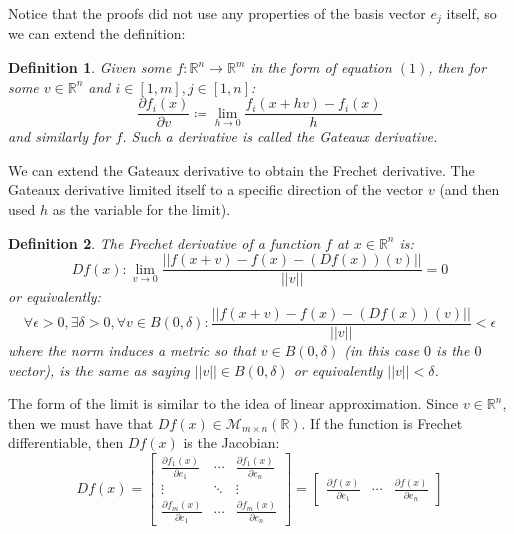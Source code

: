 \documentclass[10pt,letterpaper]{article} %
\newtheorem{defn}{Definition}[section]
\begin{document}
Notice that the proofs did not use any properties of the basis vector $e_j$ itself, so we can extend the definition:
\begin{defn}
Given some $f: \mathbb{R}^n \xrightarrow{} \mathbb{R}^m$ in the form of equation $(1)$, then for some $v \in \mathbb{R}^n$ and $i \in [1, m], j \in [1, n]$:
\begin{equation*}
\frac{\partial f_i(x)}{\partial v} \coloneq \lim_{h \xrightarrow{} 0}\frac{f_i(x+hv) - f_i(x)}{h}
\end{equation*}
and similarly for $f$. Such a derivative is called the Gateaux derivative.
\end{defn}
We can extend the Gateaux derivative to obtain the Frechet derivative. The Gateaux derivative limited itself to a specific direction of the vector $v$ (and then used $h$ as the variable for the limit).
\begin{defn}
The Frechet derivative of a function $f$ at $x \in \mathbb{R}^n$ is:
\begin{equation*}
Df(x): \lim_{v \xrightarrow{} 0} \frac{||f(x + v) - f(x) - (Df(x))(v)||}{||v||} = 0
\end{equation*}
or equivalently:
\begin{equation*}
\forall \epsilon > 0, \exists \delta > 0, \forall v \in B(0, \delta): \frac{||f(x+v) - f(x) - (Df(x))(v)||}{||v||} < \epsilon
\end{equation*}
where the norm induces a metric so that $v \in B(0, \delta)$ (in this case $0$ is the $0$ vector), is the same as saying $||v|| \in B(0, \delta)$ or equivalently $||v|| < \delta$.
\end{defn}
The form of the limit is similar to the idea of linear approximation. Since $v \in \mathbb{R}^n$, then we must have that $Df(x) \in \mathcal{M}_{m \times n}(\mathbb{R})$. If the function is Frechet differentiable, then $Df(x)$ is the Jacobian:
\begin{equation*}
Df(x) = \begin{bmatrix}
\frac{\partial f_1(x)}{\partial e_1} & \cdots &  \frac{\partial f_1(x)}{\partial e_n}\\
\vdots & \ddots & \vdots\\
\frac{\partial f_m(x)}{\partial e_1} & \cdots & \frac{\partial f_m(x)}{\partial e_n} 
\end{bmatrix} = \begin{bmatrix}
\frac{\partial f(x)}{\partial e_1} & \cdots & \frac{\partial f(x)}{\partial e_n}
\end{bmatrix}
\end{equation*}
\end{document}
